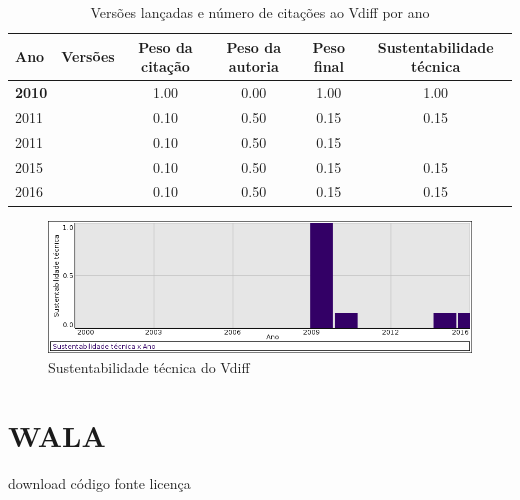 \begin{table}[H]
\caption{Versões lançadas e número de citações ao Vdiff por ano}
\centering
\begin{tabular}{| l | c | c | c | c | c |}
  \hline
  Ano & Versões & Peso da citação & Peso da autoria & Peso final & Sustentabilidade técnica \\
  \hline
            {\bf 2010}
          &
          
          &
          1.00
          &
          0.00
          &
          1.00
          &
            {\color{blue} 1.00}
          \\
\hline
            2011
          &
          
          &
          0.10
          &
          0.50
          &
          0.15
          &
            {\color{red} 0.15}
          \\
            2011
          &
          
          &
          0.10
          &
          0.50
          &
          0.15
          &
          \\
\hline
            2015
          &
          
          &
          0.10
          &
          0.50
          &
          0.15
          &
            {\color{red} 0.15}
          \\
\hline
            2016
          &
          
          &
          0.10
          &
          0.50
          &
          0.15
          &
            {\color{red} 0.15}
          \\
\hline
\end{tabular}
\end{table}

\begin{figure}[h]
  \center
  \includegraphics[scale=0.50]{imagens/softwares-charts/vdiff.png}
  \caption{Sustentabilidade técnica do Vdiff}
\end{figure}


\section{WALA}
\checkmark download
\checkmark código fonte
\checkmark licença


